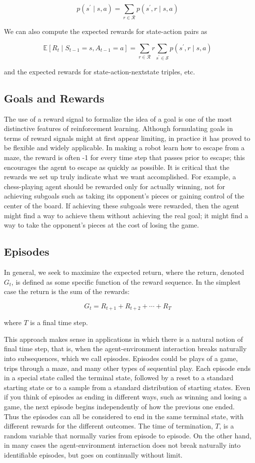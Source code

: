 \documentclass[11pt]{article}
\theoremstyle{plain} %
\theoremstyle{remark}
\begin{document}
$$
  p\left(s^{\prime} \mid s, a\right)=\sum_{r \in \mathcal{R}} p\left(s^{\prime}, r \mid s, a\right)
$$

We can also compute the expected rewards for state-action pairs as

$$
  \mathbb{E}\left[R_{t} \mid S_{t-1}=s, A_{t-1}=a\right]=\sum_{r \in \mathcal{R}} r \sum_{s^{\prime} \in \mathcal{S}} p\left(s^{\prime}, r \mid s, a\right)
$$

and the expected rewards for state-action-nextstate triples, etc.

\subsection{Goals and Rewards}
The use of a reward signal to formalize the idea of a goal is one of the
most distinctive features of reinforcement learning. Although formulating goals in terms of reward signals might at first
appear limiting, in practice it has proved to be flexible and widely
applicable. In making a robot learn how to escape from a maze, the reward is often
-1 for every time step that passes prior to escape; this encourages the agent
to escape as quickly as possible. It is critical that the rewards we set up truly indicate what we want
accomplished. For example, a chess-playing agent should be rewarded only for actually
winning, not for achieving subgoals such as taking its opponent's pieces or
gaining control of the center of the board. If achieving these subgoals were rewarded, then the agent might find a
way to achieve them without achieving the real goal; it might find a way to
take the opponent's pieces at the cost of losing the game.


\subsection{Episodes}
In general, we seek to maximize the expected return, where the return,
denoted $G_{t}$, is defined as some specific function of the reward sequence. In the simplest case the return is the sum of the rewards:

$$
  G_{t}=R_{t+1}+R_{t+2}+\cdots+R_{T}
$$

where $T$ is a final time step.

This approach makes sense in applications in which there is a natural
notion of final time step, that is, when the agent-environment interaction
breaks naturally into subsequences, which we call episodes. Episodes could be plays of a game, trips through a maze, and many other
types of sequential play. Each episode ends in a special state called the terminal state, followed
by a reset to a standard starting state or to a sample from a standard
distribution of starting states. Even if you think of episodes as ending in different ways, such as
winning and losing a game, the next episode begins independently of how the
previous one ended. Thus the episodes can all be considered to end in the same terminal
state, with different rewards for the different outcomes. The time of termination, $T$, is a random variable that normally varies
from episode to episode. On the other hand, in many cases the agent-environment interaction does
not break naturally into identifiable episodes, but goes on continually
without limit.
\end{document}
